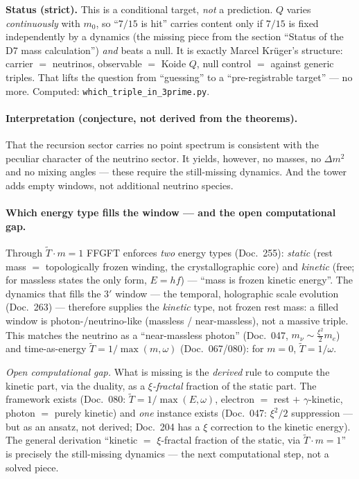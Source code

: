 \medskip\noindent\textbf{Status (strict).} This is a conditional target, \emph{not} a
prediction. $Q$ varies \emph{continuously} with $m_0$, so \enquote{$7/15$ is hit} carries
content only if $7/15$ is fixed independently by a dynamics (the missing piece from the section
\enquote{Status of the D7 mass calculation}) \emph{and} beats a null. It is exactly Marcel
Kr\"uger's structure: carrier $=$ neutrinos, observable $=$ Koide $Q$, null control $=$ against
generic triples. That lifts the question from \enquote{guessing} to a \enquote{pre-registrable
target} --- no more. Computed: \texttt{which\_triple\_in\_3prime.py}.


\paragraph{Interpretation (conjecture, not derived from the theorems).} That the recursion
sector carries no point spectrum is consistent with the peculiar character of the neutrino
sector. It yields, however, no masses, no $\Delta m^2$ and no mixing angles --- these require the
still-missing dynamics. And the tower adds empty windows, not additional neutrino species.

\paragraph{Which energy type fills the window --- and the open computational gap.} Through
$\tilde T\cdot m=1$ FFGFT enforces \emph{two} energy types (Doc.~255): \emph{static} (rest mass $=$
topologically frozen winding, the crystallographic core) and \emph{kinetic} (free; for massless
states the only form, $E=hf$) --- \enquote{mass is frozen kinetic energy}. The dynamics that fills
the $3'$ window --- the temporal, holographic scale evolution (Doc.~263) --- therefore supplies the
\emph{kinetic} type, not frozen rest mass: a filled window is photon-/neutrino-like (massless /
near-massless), not a massive triple. This matches the neutrino as a \enquote{near-massless photon}
(Doc.~047, $m_\nu\sim\tfrac{\xi^2}{2}m_e$) and time-as-energy $\tilde T=1/\max(m,\omega)$
(Doc.~067/080): for $m=0$, $\tilde T=1/\omega$.

\emph{Open computational gap.} What is missing is the \emph{derived} rule to compute the kinetic
part, via the duality, as a \emph{$\xi$-fractal} fraction of the static part. The framework exists
(Doc.~080: $\tilde T=1/\max(E,\omega)$, electron $=$ rest $+$ $\gamma$-kinetic, photon $=$ purely
kinetic) and \emph{one} instance exists (Doc.~047: $\xi^2/2$ suppression --- but as an ansatz, not
derived; Doc.~204 has a $\xi$ correction to the kinetic energy). The general derivation
\enquote{kinetic $=$ $\xi$-fractal fraction of the static, via $\tilde T\cdot m=1$} is precisely the
still-missing dynamics --- the next computational step, not a solved piece.

